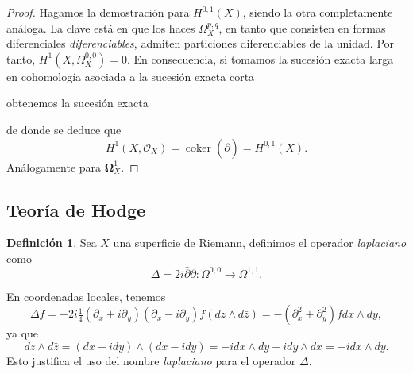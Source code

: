 \documentclass[12pt,a4paper]{article}
\theoremstyle{definition} \newtheorem{defn}[thm]{Definición}
\theoremstyle{definition} \newtheorem{ejemplo}[thm]{Ejemplo}
\theoremstyle{definition} \newtheorem{ejercicio}[thm]{Ejercicio}
\def\OO{\mathscr{O}}
\def\delbar{\bar{\partial}}
\DeclareMathOperator{\coker}{coker}
\begin{document}
\begin{proof}
  Hagamos la demostración para $H^{0,1}(X)$, siendo la otra completamente análoga. La clave está en que los haces $\Omega_X^{p,q}$, en tanto que consisten en formas diferenciales \emph{diferenciables}, admiten particiones diferenciables de la unidad. Por tanto, $H^1(X,\Omega^{0,0}_X)=0$. En consecuencia, si tomamos la sucesión exacta larga en cohomología asociada a la sucesión exacta corta
 \begin{center}      \end{center}
   obtenemos la sucesión exacta
   \begin{center}
   \end{center}
   de donde se deduce que
   \begin{equation*}
     H^1(X,\OO_X) = \coker(\delbar) = H^{0,1}(X).
   \end{equation*}
   Análogamente para $\boldsymbol{\Omega}^1_X$.
\end{proof}

\subsection{Teoría de Hodge}
\begin{defn}
  Sea $X$ una superficie de Riemann, definimos el operador \emph{laplaciano} como
  \begin{equation*}
    \Delta = 2i \delbar \partial: \Omega^{0,0} \rightarrow \Omega^{1,1}.
  \end{equation*}
\end{defn}

En coordenadas locales, tenemos
\begin{equation*}
  \Delta f = -2i \tfrac{1}{4} (\partial_x + i \partial_y)(\partial_x - i \partial_y) f (dz\wedge d\bar{z})  = - (\partial_x^2  + \partial_y^2 ) f dx \wedge dy,
\end{equation*}
ya que
\begin{equation*}
  dz \wedge d\bar{z} = (dx+idy) \wedge (dx - idy) = -idx\wedge dy + i dy \wedge dx = -idx\wedge dy.
\end{equation*}
Esto justifica el uso del nombre \emph{laplaciano} para el operador $\Delta$. 
\end{document}
